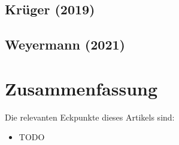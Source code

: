 \documentclass[a4paper,parskip=half]{scrartcl}
\begin{document}
\subsection*{Krüger (2019)}

\subsection*{Weyermann (2021)}

\section*{Zusammenfassung}


\parencite{Bruecklmeier2018}
\parencite{Holle2010}

\parencite{Smith2008}
\parencite{Bies2010}
\parencite{Tucker2017}

\parencite{KrausWeyermann2021a}
\parencite{KrausWeyermann2021b}
\parencite{KrausWeyermann2021c}


Die relevanten Eckpunkte dieses Artikels sind:

\begin{itemize}
\item TODO
\end{itemize}

\printbibliography[title=Quellen]
\end{document}
